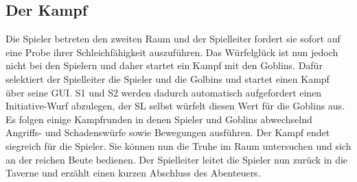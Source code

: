\subsection{Der Kampf}
\label{sec:DerKampf}
Die Spieler betreten den zweiten Raum und der Spielleiter fordert sie sofort auf eine Probe ihrer Schleichfähigkeit auszuführen. Das Würfelglück ist nun jedoch nicht bei den Spielern und daher startet ein Kampf mit den Goblins.\newline
Dafür selektiert der Spielleiter die Spieler und die Golbins und startet einen Kampf über seine GUI. S1 und S2 werden dadurch automatisch aufgefordert einen Initiative-Wurf abzulegen, der SL selbst würfelt diesen Wert für die Goblins aus. Es folgen einige Kampfrunden in denen Spieler und Goblins abwechselnd Angriffs- und Schadenswürfe sowie Bewegungen ausführen.\newline
Der Kampf endet siegreich für die Spieler. Sie können nun die Truhe im Raum untersuchen und sich an der reichen Beute bedienen. Der Spielleiter leitet die Spieler nun zurück in die Taverne und erzählt einen kurzen Abschluss des Abenteuers.


